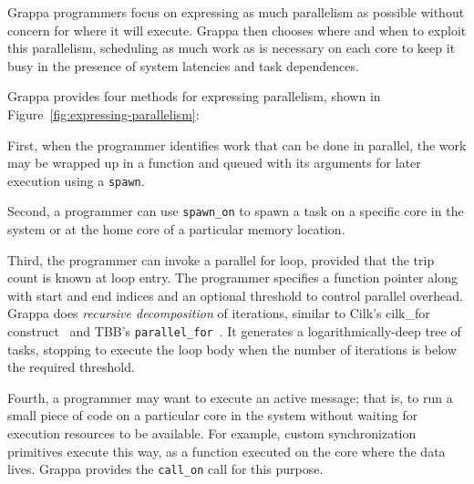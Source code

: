 Grappa programmers focus on expressing as much parallelism as possible without concern for where it will execute. Grappa then chooses where and when to exploit this parallelism, scheduling as much work as is necessary on each core to keep it busy in the presence of system latencies and task dependences.

Grappa provides four methods for expressing parallelism, shown in Figure~\ref{fig:expressing-parallelism}:

First, when the programmer identifies work that can be done in parallel, the work may be wrapped up in a function and queued with its arguments for later execution using a \texttt{spawn}.

Second, a programmer can use \texttt{spawn\_on} to spawn a task on a specific core in the system or at the home core of a particular memory location.

Third, the programmer can invoke a parallel for loop, provided that the trip count is known at loop entry. The programmer specifies a function pointer along with start and end indices and an optional threshold to control parallel overhead. Grappa does {\em recursive decomposition} of iterations, similar to Cilk's cilk\_for construct~\cite {cilkforimplementation} and TBB's {\tt parallel\_for}~\cite{intel_tbb}.  It generates a logarithmically-deep tree of tasks, stopping to execute the loop body when the number of iterations is below the required threshold.

Fourth, a programmer may want to execute an active message; that is, to run a small piece of code on a particular core in the system without waiting for execution resources to be available.  For example, custom synchronization primitives execute this way, as a function executed on the core where the data lives.  Grappa provides the \texttt{call\_on} call for this purpose.

